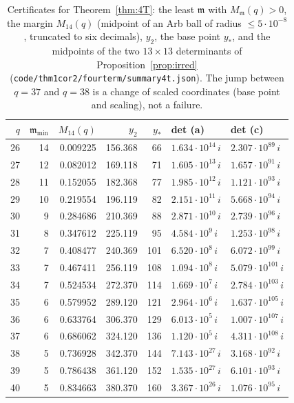 \documentclass[11pt]{amsart}
\theoremstyle{definition}
\theoremstyle{remark}
\numberwithin{equation}{section}
\newcommand{\fm}{\mathfrak{m}}
\newcommand{\file}[1]{{\def\_{\textunderscore\allowbreak}\texttt{#1}}}
\begin{document}
\begin{table}
\caption{Certificates for Theorem~\ref{thm:4T}: the least $\fm$ with $M_\fm(q)>0$, the margin $M_{14}(q)$ (midpoint of
an Arb ball of radius $\le5\cdot10^{-8}$, truncated to six decimals), $y_2$, the base point $y_*$, and the midpoints of the two $13\times13$
determinants of Proposition~\ref{prop:irred} (\file{code/thm1\_cor2/fourterm/summary\_4t.json}). The jump between
$q=37$ and $q=38$ is a change of scaled coordinates (base point and scaling), not a failure.}\label{tab:4T}
\small
\begin{tabular}{rrrrrll}
\toprule
$q$ & $\fm_{\min}$ & $M_{14}(q)$ & $y_2$ & $y_*$ & det (a) & det (c)\\
\midrule
26 & 14 & 0.009225 & 156.368 & 66 & $1.634\cdot10^{14}\,i$ & $2.307\cdot10^{89}\,i$ \\
27 & 12 & 0.082012 & 169.118 & 71 & $1.605\cdot10^{13}\,i$ & $1.657\cdot10^{91}\,i$ \\
28 & 11 & 0.152055 & 182.368 & 77 & $1.985\cdot10^{12}\,i$ & $1.121\cdot10^{93}\,i$ \\
29 & 10 & 0.219554 & 196.119 & 82 & $2.151\cdot10^{11}\,i$ & $5.668\cdot10^{94}\,i$ \\
30 & 9 & 0.284686 & 210.369 & 88 & $2.871\cdot10^{10}\,i$ & $2.739\cdot10^{96}\,i$ \\
31 & 8 & 0.347612 & 225.119 & 95 & $4.584\cdot10^{9}\,i$ & $1.253\cdot10^{98}\,i$ \\
32 & 7 & 0.408477 & 240.369 & 101 & $6.520\cdot10^{8}\,i$ & $6.072\cdot10^{99}\,i$ \\
33 & 7 & 0.467411 & 256.119 & 108 & $1.094\cdot10^{8}\,i$ & $5.079\cdot10^{101}\,i$ \\
34 & 7 & 0.524534 & 272.370 & 114 & $1.669\cdot10^{7}\,i$ & $2.784\cdot10^{103}\,i$ \\
35 & 6 & 0.579952 & 289.120 & 121 & $2.964\cdot10^{6}\,i$ & $1.637\cdot10^{105}\,i$ \\
36 & 6 & 0.633764 & 306.370 & 129 & $6.013\cdot10^{5}\,i$ & $1.007\cdot10^{107}\,i$ \\
37 & 6 & 0.686062 & 324.120 & 136 & $1.120\cdot10^{5}\,i$ & $4.311\cdot10^{108}\,i$ \\
38 & 5 & 0.736928 & 342.370 & 144 & $7.143\cdot10^{27}\,i$ & $3.168\cdot10^{92}\,i$ \\
39 & 5 & 0.786438 & 361.120 & 152 & $1.535\cdot10^{27}\,i$ & $6.101\cdot10^{93}\,i$ \\
40 & 5 & 0.834663 & 380.370 & 160 & $3.367\cdot10^{26}\,i$ & $1.076\cdot10^{95}\,i$ \\

\end{tabular}
\end{table}
\end{document}
